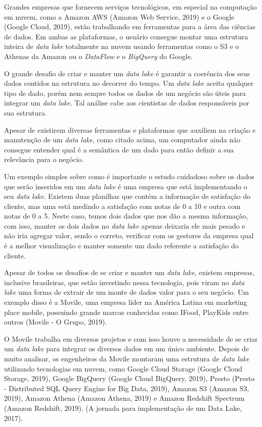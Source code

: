 \documentclass[
	12pt,				%
	openright,			%
	oneside,			%
	a4paper,			%
	chapter=TITLE,		%
	section=TITLE,		%
	subsection=TITLE,	%
	subsubsection=TITLE,%
	english,			%
	brazil				%
	]{abntex2}
\theoremstyle{definition}
\begin{document}
   Grandes empresas que fornecem serviços tecnológicos, em especial na computação em nuvem, como a Amazon AWS (Amazon Web Service, 2019) e o Google (Google Cloud, 2019), estão trabalhando em ferramentas para a área das ciências de dados. Em ambas as plataformas, o usuário consegue montar uma estrutura inteira de \textit{data lake} totalmente na nuvem usando ferramentas como o S3 e o Athenas da Amazon ou o \textit{DataFlow} e o \textit{BigQuery} do Google.

    O grande desafio de criar e manter um \textit{data lake} é garantir a coerência dos seus dados contidos na estrutura no decorrer do tempo. Um \textit{data lake} aceita qualquer tipo de dado, porém nem sempre todos os dados de um negócio são úteis para integrar um \textit{data lake}. Tal análise cabe aos cientistas de dados responsáveis por sua estrutura. 
    
    Apesar de existirem diversas ferramentas e plataformas que auxiliem na criação e manutenção de um \textit{data lake}, como citado acima, um computador ainda não consegue entender qual é a semântica de um dado para então definir a sua relevância para o negócio. 
    
    Um exemplo simples sobre como é importante o estudo cuidadoso sobre os dados que serão inseridos em um \textit{data lake} é uma empresa que está implementando o seu \textit{data lake}. Existem duas planilhas que contém a informação de satisfação do cliente, mas uma está medindo a satisfação com notas de 0 a 10 e outra com notas de 0 a 5. Neste caso, temos dois dados que nos dão a mesma informação, com isso, manter os dois dados no \textit{data lake} apenas deixaria ele mais pesado e não iria agregar valor, sendo o correto, verificar com os gestores da empresa qual é a melhor visualização e manter somente um dado referente a satisfação do cliente.
 
    Apesar de todos os desafios de se criar e manter um \textit{data lake}, existem empresas, inclusive brasileiras, que estão investindo nessa tecnologia, pois viram no \textit{data lake} uma forma de extrair de um monte de dados valor para o seu negócio. Um exemplo disso é a Movile, uma empresa líder na América Latina em marketing place mobile, possuindo grande marcas conhecidas como IFood, PlayKids entre outros (Movile - O Grupo, 2019). 
    
    O Movile trabalha em diversos projetos e com isso houve a necessidade de se criar um \textit{data lake} para integrar os diversos dados em um único ambiente. Depois de muito analisar, os engenheiros da Movile montaram uma estrutura de \textit{data lake} utilizando tecnologias em nuvem, como Google Cloud Storage (Google Cloud Storage, 2019), Google BigQuery (Google Cloud BigQuery, 2019), Presto (Presto - Distributed SQL Query Engine for Big Data, 2019), Amazon S3 (Amazon S3, 2019), Amazon Athena (Amazon Athena, 2019) e Amazon Redshift Spectrum (Amazon Redshift, 2019). (A jornada para implementação de um Data Lake, 2017). 
    
\end{document}
